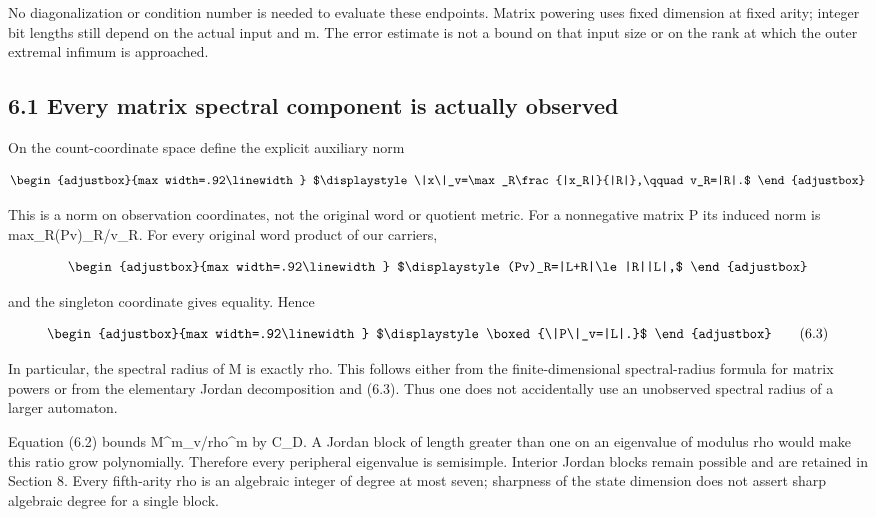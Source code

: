 No diagonalization or condition number is needed to evaluate these endpoints. Matrix powering uses fixed dimension at fixed arity; integer bit lengths still depend on the actual input and m. The error estimate is not a bound on that input size or on the rank at which the outer extremal infimum is approached.

\subsection{6.1 Every matrix spectral component is actually observed}\label{n24-every-matrix-spectral-component-is-actually-observed}

On the count-coordinate space define the explicit auxiliary norm

\[
\begin{adjustbox}{max width=.92\linewidth}
$\displaystyle \|x\|_v=\max_R\frac{|x_R|}{|R|},\qquad v_R=|R|.$
\end{adjustbox}
\]

This is a norm on observation coordinates, not the original word or quotient metric. For a nonnegative matrix P its induced norm is max\_R(Pv)\_R/v\_R. For every original word product of our carriers,

\[
\begin{adjustbox}{max width=.92\linewidth}
$\displaystyle (Pv)_R=|L+R|\le |R||L|,$
\end{adjustbox}
\]

and the singleton coordinate gives equality. Hence

\[
\begin{adjustbox}{max width=.92\linewidth}
$\displaystyle \boxed{\|P\|_v=|L|.}$
\end{adjustbox}
\tag{6.3}
\]

In particular, the spectral radius of M is exactly rho. This follows either from the finite-dimensional spectral-radius formula for matrix powers or from the elementary Jordan decomposition and (6.3). Thus one does not accidentally use an unobserved spectral radius of a larger automaton.

Equation (6.2) bounds \textbar\textbar M\^{}m\textbar\textbar\_v/rho\^{}m by C\_D. A Jordan block of length greater than one on an eigenvalue of modulus rho would make this ratio grow polynomially. Therefore every peripheral eigenvalue is semisimple. Interior Jordan blocks remain possible and are retained in Section 8. Every fifth-arity rho is an algebraic integer of degree at most seven; sharpness of the state dimension does not assert sharp algebraic degree for a single block.

